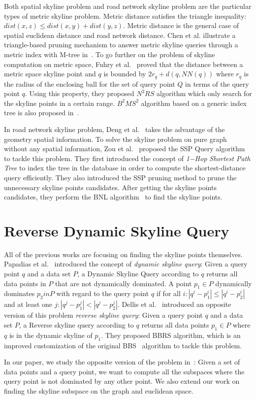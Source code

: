 Both spatial skyline problem and road network skyline problem are the particular types of metric skyline problem. Metric distance satisfies the triangle inequality: $dist(x, z) \leq dist(x, y) + dist(y, z)$. Metric distance is the general case of spatial euclidean distance and road network distance. Chen et al. illustrate a triangle-based pruning mechanism to answer metric skyline queries through a metric index with M-tree in~\cite{chen2008dynamic}. To go further on the problem of skyline computation on metric space, Fuhry et al.~\cite{fuhry2009efficient} proved that the distance between a metric space skyline point and $q$ is bounded by $2r_q + d(q, NN(q))$ where $r_q$ is the radius of the enclosing ball for the set of query point $Q$ in terms of the query point $q$. Using this property, they proposed $N^2RS$ algorithm which only search for the skyline points in a certain range. $B^2MS^2$ algorithm based on a generic index tree is also proposed in~\cite{fuhry2009efficient}.

In road network skyline problem, Deng et al.~\cite{deng2007multi} takes the advantage of the geometry spatial information. To solve the skyline problem on pure graph without any spatial information, Zou et al.~\cite{zou2010dynamic} proposed the SSP Query algorithm to tackle this problem. They first introduced the concept of \emph{1−Hop Shortest Path Tree} to index the tree in the database in order to compute the shortest-distance query efficiently. They also introduced the SSP pruning method to prune the unnecessary skyline points candidates. After getting the skyline points candidates, they perform the BNL algorithm~\cite{borzsony2001skyline} to find the skyline points.

\section{Reverse Dynamic Skyline Query}
All of the previous works are focusing on finding the skyline points themselves. Papadias et al.~\cite{papadias2003optimal} introduced the concept of \emph{dynamic skyline query}: Given a query point $q$ and a data set $P$, a Dynamic Skyline Query according to $q$ returns all data points in $P$ that are not dynamically dominated. A point $p_1 \in P$ dynamically dominates $p_2 in P$ with regard to the query point $q$ if for all $i: |q^i-p^i_1| \leq |q^i-p^i_2|$ and at least one $j: |q^j-p^j_1| < |q^j-p^j_2|$. Dellis et al.~\cite{dellis2007efficient} introduced an opposite version of this problem \emph{reverse skyline query}: Given a query point $q$ and a data set $P$, a Reverse skyline query according to $q$ returns all data points $p_1 \in P$ where $q$ is in the dynamic skyline of $p_1$. They proposed BBRS algorithm, which is an improved customization of the original BBS~\cite{papadias2003optimal} algorithm to tackle this problem.

In our paper, we study the opposite version of the problem in~\cite{tao2006subsky}: Given a set of data points and a query point, we want to compute all the subspaces where the query point is not dominated by any other point. We also extend our work on finding the skyline subspace on the graph and euclidean space.



